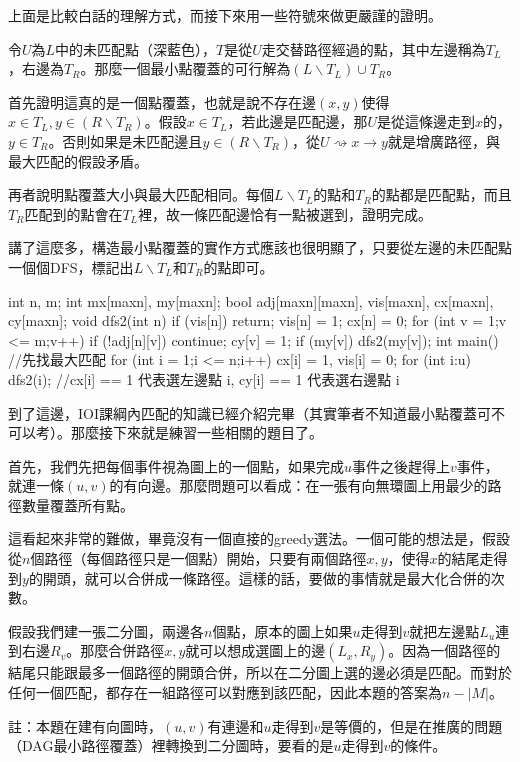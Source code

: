 上面是比較白話的理解方式，而接下來用一些符號來做更嚴謹的證明。
\par 令$U$為$L$中的未匹配點（深藍色），$T$是從$U$走交替路徑經過的點，其中左邊稱為$T_L$，右邊為$T_R$。那麼一個最小點覆蓋的可行解為$(L \backslash T_L) \cup T_R$。
\par 首先證明這真的是一個點覆蓋，也就是說不存在邊$(x, y)$使得$x \in T_L,y \in (R \backslash T_R)$。假設$x \in T_L$，若此邊是匹配邊，那$U$是從這條邊走到$x$的，$y \in T_R$。否則如果是未匹配邊且$y \in (R \backslash T_R)$，從$U 	\rightsquigarrow x \rightarrow y$就是增廣路徑，與最大匹配的假設矛盾。
\par 再者說明點覆蓋大小與最大匹配相同。每個$L \backslash T_L$的點和$T_R$的點都是匹配點，而且$T_R$匹配到的點會在$T_L$裡，故一條匹配邊恰有一點被選到，證明完成。
\par 講了這麼多，構造最小點覆蓋的實作方式應該也很明顯了，只要從左邊的未匹配點一個個DFS，標記出$L \backslash T_L$和$T_R$的點即可。
\begin{C++}
int n, m;
int mx[maxn], my[maxn];
bool adj[maxn][maxn], vis[maxn], cx[maxn], cy[maxn]; 
void dfs2(int n) {
	if (vis[n]) return;
	vis[n] = 1;
	cx[n] = 0;
	for (int v = 1;v <= m;v++) {
		if (!adj[n][v]) continue;
		cy[v] = 1;
		if (my[v]) {
			dfs2(my[v]);
		}
	}
}
int main() {
    //先找最大匹配
    for (int i = 1;i <= n;i++) {
    	cx[i] = 1, vis[i] = 0;
    }
	for (int i:u) dfs2(i);
	//cx[i] == 1 代表選左邊點 i, cy[i] == 1 代表選右邊點 i
}
\end{C++}

到了這邊，IOI課綱內匹配的知識已經介紹完畢（其實筆者不知道最小點覆蓋可不可以考）。那麼接下來就是練習一些相關的題目了。
\par 首先，我們先把每個事件視為圖上的一個點，如果完成$u$事件之後趕得上$v$事件，就連一條$(u, v)$的有向邊。那麼問題可以看成：在一張有向無環圖上用最少的路徑數量覆蓋所有點。
\par 這看起來非常的難做，畢竟沒有一個直接的greedy選法。一個可能的想法是，假設從$n$個路徑（每個路徑只是一個點）開始，只要有兩個路徑$x, y$，使得$x$的結尾走得到$y$的開頭，就可以合併成一條路徑。這樣的話，要做的事情就是最大化合併的次數。
\par 假設我們建一張二分圖，兩邊各$n$個點，原本的圖上如果$u$走得到$v$就把左邊點$L_u$連到右邊$R_v$。那麼合併路徑$x, y$就可以想成選圖上的邊$(L_x, R_y)$。因為一個路徑的結尾只能跟最多一個路徑的開頭合併，所以在二分圖上選的邊必須是匹配。而對於任何一個匹配，都存在一組路徑可以對應到該匹配，因此本題的答案為$n - |M|$。
\par 註：本題在建有向圖時，$(u, v)$有連邊和$u$走得到$v$是等價的，但是在推廣的問題（DAG最小路徑覆蓋）裡轉換到二分圖時，要看的是$u$走得到$v$的條件。
